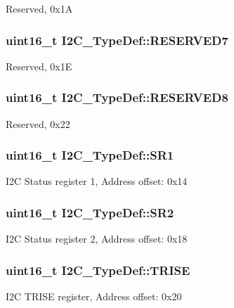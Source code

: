 Reserved, 0x1\-A \hypertarget{struct_i2_c___type_def_a0f398bdcc3f24e7547c3cb9343111fd0}{
\subsubsection[{R\-E\-S\-E\-R\-V\-E\-D7}]{\setlength{\rightskip}{0pt plus 5cm}uint16\-\_\-t I2\-C\-\_\-\-Type\-Def\-::\-R\-E\-S\-E\-R\-V\-E\-D7}}\label{struct_i2_c___type_def_a0f398bdcc3f24e7547c3cb9343111fd0}
Reserved, 0x1\-E \hypertarget{struct_i2_c___type_def_a6e762751c9d5a1e41efb6033a26d8ed8}{
\subsubsection[{R\-E\-S\-E\-R\-V\-E\-D8}]{\setlength{\rightskip}{0pt plus 5cm}uint16\-\_\-t I2\-C\-\_\-\-Type\-Def\-::\-R\-E\-S\-E\-R\-V\-E\-D8}}\label{struct_i2_c___type_def_a6e762751c9d5a1e41efb6033a26d8ed8}
Reserved, 0x22 \hypertarget{struct_i2_c___type_def_ae1602cd1c9cad449523099c97138f991}{
\subsubsection[{S\-R1}]{ uint16\-\_\-t I2\-C\-\_\-\-Type\-Def\-::\-S\-R1}}\label{struct_i2_c___type_def_ae1602cd1c9cad449523099c97138f991}
I2\-C Status register 1, Address offset\-: 0x14 \hypertarget{struct_i2_c___type_def_a95c7f729b10eb2acafe499d9c9a81a83}{
\subsubsection[{S\-R2}]{ uint16\-\_\-t I2\-C\-\_\-\-Type\-Def\-::\-S\-R2}}\label{struct_i2_c___type_def_a95c7f729b10eb2acafe499d9c9a81a83}
I2\-C Status register 2, Address offset\-: 0x18 \hypertarget{struct_i2_c___type_def_aaba7a808e4dfae5cc06b197c298af206}{
\subsubsection[{T\-R\-I\-S\-E}]{ uint16\-\_\-t I2\-C\-\_\-\-Type\-Def\-::\-T\-R\-I\-S\-E}}\label{struct_i2_c___type_def_aaba7a808e4dfae5cc06b197c298af206}
I2\-C T\-R\-I\-S\-E register, Address offset\-: 0x20 

